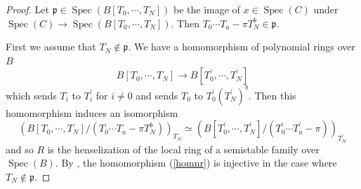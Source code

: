 \documentclass{article}
\newcommand{\spec}{\operatorname{Spec}}
\begin{document}
%
\begin{proof}\upshape
Let $\mathfrak{p}\in \spec(B[T_{0}, \cdots, T_{N}])$ be
the image of $x\in\spec(C)$ under
$\spec(C)\to \spec(B[T_{0}, \cdots, T_{N}])$.
Then 
%
\begin{math}
T_{0}\cdots T_{a}-\pi T_{N}^{b}\in \mathfrak{p}.    
\end{math}
%

First we assume that $T_{N}\notin \mathfrak{p}$. We have a homomorphism of polynomial rings over 
$B$
%
\begin{equation*}
B[T_{0}, \cdots, T_{N}]
\to
B[T_{0}^{\prime}, \cdots, T_{N}^{\prime}]
\end{equation*}
%
which sends $T_{i}$ to $T_{i}^{\prime}$ for $i\neq 0$
and
sends $T_{0}$ to $T_{0}^{\prime}(T_{N}^{\prime})^{b}$.
Then this homomorphism induces an isomorphism
%
\begin{equation*}
\left(
B[T_{0}, \cdots, T_{N}]/
(T_{0}\cdots T_{a}
-\pi T_{N}^{b})
\right)_{T_{N}}
\simeq 
\left(
B[
T_{0}^{\prime},
\cdots,
T_{N}^{\prime}]/
(T^{\prime}_{0}\cdots T_{a}^{\prime}-\pi)
\right)_{T_{N}^{\prime}}
\end{equation*}
%
and so $R$ is the henselization of the local ring of a semistable family over $\spec(B)$.
By \cite[p.35, Proposition 5]{SM19}, the homomorphism (\ref{homnr}) is injective in the case where 
$T_{N}\notin\mathfrak{p}$.



\end{proof}
\end{document}
